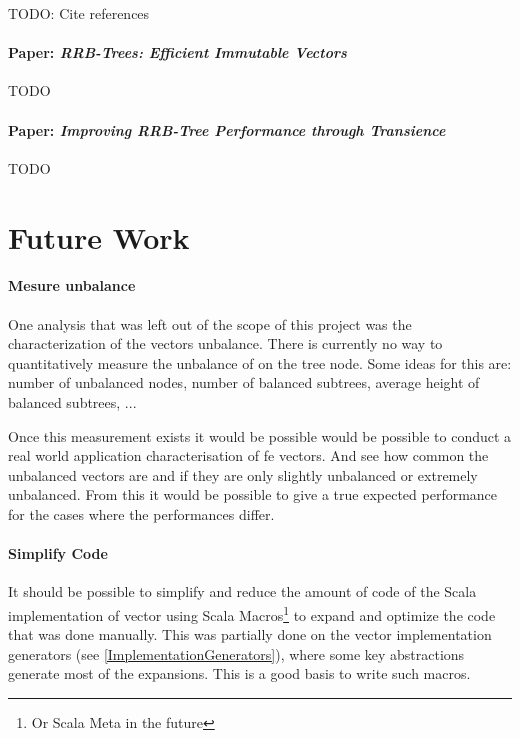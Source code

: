 \color{red} TODO: Cite references \color{black}

\paragraph{Paper: \emph{RRB-Trees: Efficient Immutable Vectors}}
\color{red} TODO \color{black}

\paragraph{Paper: \emph{Improving RRB-Tree Performance through Transience}}



\color{red} TODO \color{black}



\section{Future Work}

\paragraph{Mesure unbalance}
One analysis that was left out of the scope of this project was the characterization of the vectors unbalance. There is currently no way to quantitatively measure the unbalance of on the tree node. Some ideas for this are: number of unbalanced nodes, number of balanced subtrees, average height of balanced subtrees, ... 

Once this measurement exists it would be possible would be possible to conduct a real world application characterisation of fe vectors. And see how common the unbalanced vectors are and if they are only slightly unbalanced or extremely unbalanced. From this it would be possible to give a true expected performance for the cases where the performances differ.

\paragraph{Simplify Code}
It should be possible to simplify and reduce the amount of code of the Scala implementation of vector using Scala Macros\footnote{Or Scala Meta in the future} to expand and optimize the code that was done manually. This was partially done on the vector implementation generators (see \ref{ImplementationGenerators}), where some key abstractions generate most of the expansions. This is a good basis to write such macros.

